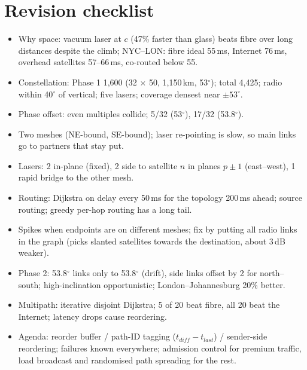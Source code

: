 \section{Revision checklist}
\begin{itemize}
  \item Why space: vacuum laser at $c$ (47\% faster than glass) beats fibre over long distances despite the climb; NYC--LON: fibre ideal 55\,ms, Internet 76\,ms, overhead satellites 57--66\,ms, co-routed below 55.
  \item Constellation: Phase 1 1,600 (32 $\times$ 50, 1,150\,km, 53$^\circ$); total 4,425; radio within 40$^\circ$ of vertical; five lasers; coverage densest near $\pm 53^\circ$.
  \item Phase offset: even multiples collide; 5/32 (53$^\circ$), 17/32 (53.8$^\circ$).
  \item Two meshes (NE-bound, SE-bound); laser re-pointing is slow, so main links go to partners that stay put.
  \item Lasers: 2 in-plane (fixed), 2 side to satellite $n$ in planes $p \pm 1$ (east--west), 1 rapid bridge to the other mesh.
  \item Routing: Dijkstra on delay every 50\,ms for the topology 200\,ms ahead; source routing; greedy per-hop routing has a long tail.
  \item Spikes when endpoints are on different meshes; fix by putting all radio links in the graph (picks slanted satellites towards the destination, about 3\,dB weaker).
  \item Phase 2: 53.8$^\circ$ links only to 53.8$^\circ$ (drift), side links offset by 2 for north--south; high-inclination opportunistic; London--Johannesburg 20\% better.
  \item Multipath: iterative disjoint Dijkstra; 5 of 20 beat fibre, all 20 beat the Internet; latency drops cause reordering.
  \item Agenda: reorder buffer / path-ID tagging ($t_{diff} - t_{last}$) / sender-side reordering; failures known everywhere; admission control for premium traffic, load broadcast and randomised path spreading for the rest.
\end{itemize}
